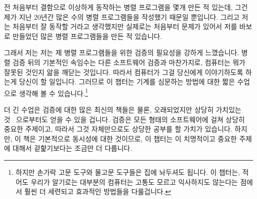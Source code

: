 
%

전 처음부터 결함으로 이상하게 동작하는 병렬 프로그램을 몇개 만든 적 있는데,
그건 제가 지난 20년간 많은 수의 병렬 프로그램들을 작성했기 때문일 뿐입니다.
그리고 저는 처음부터 잘 동작할 거라고 생각했지만 실제로는 처음부터 문제가
있어서 저를 바보로 만들었던 많은 병렬 프로그램들을 만든 적 있습니다.

그래서 저는 저는 제 병렬 프로그램들을 위한 검증의 필요성을 강하게 느꼈습니다.
병렬 검증 뒤의 기본적인 속임수는 다른 소프트웨어 검증과 마찬가지로, 컴퓨터는
뭐가 잘못된 것인지 앎을 깨닫는 것입니다.
따라서 컴퓨터가 그걸 당신에게 이야기하도록 하는게 당신이 할 일입니다.
그러므로 이 챕터는 기계를 심문하는 방법에 대한 짧은 수업으로 생각해 볼 수
있습니다.\footnote{
	하지만 손가락 고문 도구와 물고문 도구들은 집에 놔두셔도 됩니다.
	이 챕터는, 적어도 우리가 알기로는 대부분의 컴퓨터는 고통도 모르고
	익사하지도 않는다는 점에서 훨씬 더 세련되고 효과적인 방법들을
	다룰겁니다.}

더 긴 수업은 검증에 대한 많은 최신의 책들은 물론, 오래되었지만 상당히 가치있는
것~\cite{GlenfordJMyers1979} 으로부터도 얻을 수 있을 겁니다.
검증은 모든 형태의 소프트웨어에 걸쳐 상당히 중요한 주제이고, 따라서 그것
자체만으로도 상당한 공부를 할 가치가 있습니다.
하지만, 이 책은 기본적으로 동시성에 대한 것이므로, 이 챕터는 이 치명적이고
중요한 주제에 대해서 겉핥기보다는 조금만 더 다룹니다.
\iffalse

